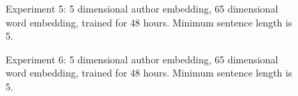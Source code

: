 \documentclass{article}%
\begin{document}
\begin{figure}
\noindent{}
\caption{Experiment 5: 5 dimensional author embedding, 65 dimensional word embedding, trained for 48 hours. Minimum sentence length is 5.}
\end{figure}
\begin{figure}
\noindent{}
\caption{Experiment 6: 5 dimensional author embedding, 65 dimensional word embedding, trained for 48 hours. Minimum sentence length is 5.}
\end{figure}
\end{document}
